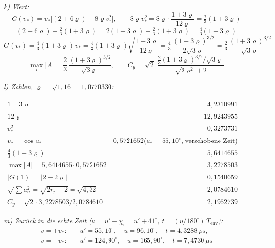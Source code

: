 \noindent\textit{k) Wert:}
\begin{equation}
  G(v_*) = v_*\bigl[(2+6\varrho)-8\varrho v_*^2\bigr],\qquad
  8\varrho v_*^2 = 8\varrho\cdot\frac{1+3\varrho}{12\varrho} = \tfrac23(1+3\varrho)
\end{equation}
\begin{equation}
  (2+6\varrho)-\tfrac23(1+3\varrho) = 2(1+3\varrho)-\tfrac23(1+3\varrho) = \tfrac43(1+3\varrho)
\end{equation}
\begin{equation}
  G(v_*) = \tfrac43(1+3\varrho)\,v_*
         = \tfrac43(1+3\varrho)\sqrt{\frac{1+3\varrho}{12\varrho}}
         = \tfrac43\,\frac{(1+3\varrho)^{3/2}}{2\sqrt{3\varrho}}
         = \tfrac23\,\frac{(1+3\varrho)^{3/2}}{\sqrt{3\varrho}}
\end{equation}
\begin{equation}
  \boxed{\;
  \max_t|A| = \frac23\,\frac{(1+3\varrho)^{3/2}}{\sqrt{3\varrho}},\qquad
  C_y = \sqrt2\;\frac{\tfrac23(1+3\varrho)^{3/2}/\sqrt{3\varrho}}{\sqrt{2\varrho^2+2}}
  \;}
  \label{eq:cf-n4closed}
\end{equation}

\noindent\textit{l) Zahlen, $\varrho=\sqrt{1{,}16}=1{,}0770330$:}
\begin{center}
\begin{tabular}{l|r}
  \hline
  $1+3\varrho$ & $4{,}2310991$\\
  $12\varrho$ & $12{,}9243955$\\
  $v_*^2$ & $0{,}3273731$\\
  $v_*=\cos u_*$ & $0{,}5721652$\quad ($u_*=55{,}10^\circ$, verschobene Zeit)\\
  $\tfrac43(1+3\varrho)$ & $5{,}6414655$\\
  $\max|A| = 5{,}6414655\cdot0{,}5721652$ & $3{,}2278503$\\
  $|G(1)| = |2-2\varrho|$ & $0{,}1540659$\\
  $\sqrt{\sum a_n^2}=\sqrt{2r_y+2}=\sqrt{4{,}32}$ & $2{,}0784610$\\
  $C_y = \sqrt2\cdot3{,}2278503/2{,}0784610$ & $2{,}1962739$\\
  \hline
\end{tabular}
\end{center}

\noindent\textit{m) Zur\"uck in die echte Zeit ($u=u'-\chi_\mathrm{i}=u'+41^\circ$, $t=(u/180^\circ)\,T_\mathrm{env}$):}
\begin{align}
  v=+v_*:&\quad u'=55{,}10^\circ,\quad u=96{,}10^\circ,\quad t=4{,}3288\ \mu\mathrm{s},\\
  v=-v_*:&\quad u'=124{,}90^\circ,\quad u=165{,}90^\circ,\quad t=7{,}4730\ \mu\mathrm{s}
\end{align}
